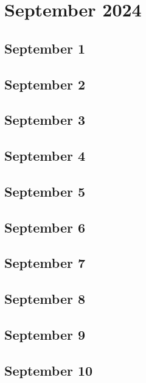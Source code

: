 %
%
%

\chapter{September 2024}
\label{intro} %

\section{September 1}

\section{September 2}

\section{September 3}

\section{September 4}

\section{September 5}

\section{September 6}

\section{September 7}

\section{September 8}

\section{September 9}

\section{September 10}

